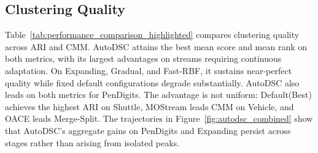 \documentclass[conference]{IEEEtran}
\begin{document}
\subsection{Clustering Quality}
Table~\ref{tab:performance_comparison_highlighted} compares clustering quality across ARI and CMM. AutoDSC attains the best mean score and mean rank on both metrics, with its largest advantages on streams requiring continuous adaptation. On Expanding, Gradual, and Fast-RBF, it sustains near-perfect quality while fixed default configurations degrade substantially. AutoDSC also leads on both metrics for PenDigits. The advantage is not uniform: Default(Best) achieves the highest ARI on Shuttle, MOStream leads CMM on Vehicle, and OACE leads Merge-Split. The trajectories in Figure~\ref{fig:autodsc_combined} show that AutoDSC's aggregate gains on PenDigits and Expanding persist across stages rather than arising from isolated peaks.
\end{document}
